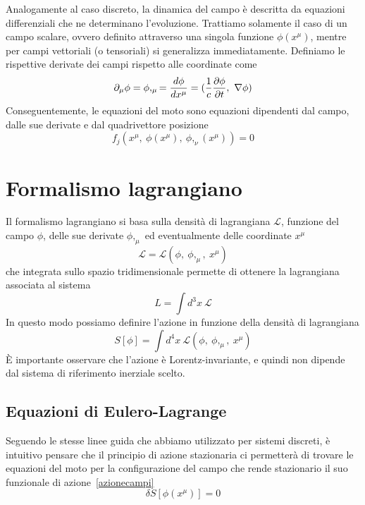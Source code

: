     Analogamente al caso discreto, la dinamica del campo è descritta da equazioni differenziali che ne determinano l'evoluzione. Trattiamo solamente il caso di un campo scalare, ovvero definito attraverso una singola funzione $\phi(x^\mu)$, mentre per campi vettoriali (o tensoriali) si generalizza immediatamente. Definiamo le rispettive derivate dei campi rispetto alle coordinate come
    \begin{equation*}
        \partial_\mu \phi =  \phi,_\mu = \frac{d\phi}{dx^\mu} = (\frac{1}{c} \frac{\partial\phi}{\partial t}, ~ \nabla \phi)
    \end{equation*}
    Conseguentemente, le equazioni del moto sono equazioni dipendenti dal campo, dalle sue derivate e dal quadrivettore posizione
    \begin{equation} \label{motocampi}
        f_j(x^\mu, ~\phi(x^\mu), ~\phi,_\nu(x^\mu)) = 0
    \end{equation}

\section{Formalismo lagrangiano}    

    Il formalismo lagrangiano si basa sulla densità di lagrangiana $\mathcal L$, funzione del campo $\phi$, delle sue derivate $\phi,_\mu$ ed eventualmente delle coordinate $x^\mu$
    \begin{equation} \label{lagrangianacampi}
        \mathcal L = \mathcal L (\phi,~\phi,_\mu,~x^\mu)
    \end{equation}
    che integrata sullo spazio tridimensionale permette di ottenere la lagrangiana associata al sistema
    \begin{equation*}
        L = \int d^3 x ~ \mathcal L
    \end{equation*}
    In questo modo possiamo definire l'azione in funzione della densità di lagrangiana
    \begin{equation} \label{azionecampi}
        S[\phi] = \int d^4 x ~ \mathcal L (\phi,~\phi,_\mu,~x^\mu)
    \end{equation}
    È importante osservare che l'azione è Lorentz-invariante, e quindi non dipende dal sistema di riferimento inerziale scelto.

\subsection{Equazioni di Eulero-Lagrange}

    Seguendo le stesse linee guida che abbiamo utilizzato per sistemi discreti, è intuitivo pensare che il principio di azione stazionaria ci permetterà di trovare le equazioni del moto per la configurazione del campo che rende stazionario il suo funzionale di azione~\eqref{azionecampi}
    \begin{equation} \label{azionestazionariacampi}
        \delta S [\phi(x^\mu)] = 0
    \end{equation}

